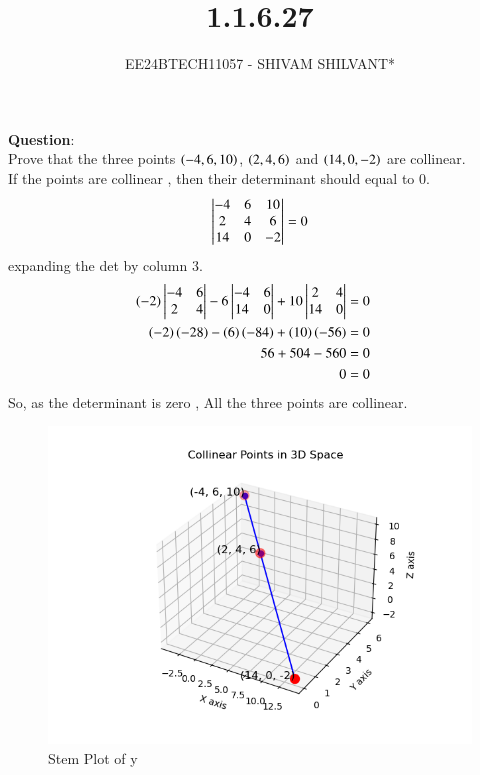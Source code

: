 \documentclass[journal]{IEEEtran}
\begin{document}

\vspace{3cm}

\title{1.1.6.27}
\author{EE24BTECH11057 - SHIVAM SHILVANT*}
{\let\newpage\relax\maketitle}

\renewcommand{\thefigure}{\theenumi}
\renewcommand{\thetable}{\theenumi}
\setlength{\intextsep}{10pt} %


\renewcommand{\thetable}{\theenumi}


\textbf{Question}:\\
Prove that the three points  $\left(-4,6,10\right)$, $\left(2,4,6\right)$ and $\left(14,0,-2\right)$ are collinear.\\
If the points are collinear , then their determinant should equal to 0.
\begin{align}
 \begin{vmatrix}-4 & 6 & 10 \\ 2 & 4 & 6 \\ 14 & 0 & -2\end{vmatrix} = 0 \label{1.6.9.1}
\end{align}
expanding the det by column 3.
\begin{align}
 \left(-2\right)\begin{vmatrix}-4 & 6 \\ 2 & 4\end{vmatrix} - 6\begin{vmatrix} -4 & 6 \\14 & 0 \end{vmatrix} + 10\begin{vmatrix} 2 & 4 \\ 14 & 0 \end{vmatrix} &= 0& \\
 \left(-2\right)\left(-28\right) - \left(6\right)\left(-84\right) + \left(10\right)\left(-56\right) &= 0& \\
 56 + 504 - 560 &= 0& \\
 0 &= 0& \\
\end{align}
So, as the determinant is zero , All the three points are collinear.
\begin{figure}[h!]
   \centering
   \includegraphics[width=0.7\linewidth]{figs/Figure_1.png}
   \caption{Stem Plot of y}
   \label{stemplot}
\end{figure}
\end{document}
